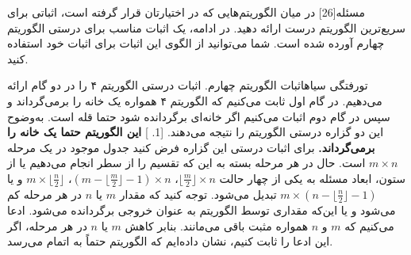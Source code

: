‌مسئله[26]
در میان الگوریتم‌هایی که در اختیارتان قرار گرفته است، اثباتی برای سریع‌ترین الگوریتم درست ارائه دهید. در ادامه، یک اثبات مناسب برای درستی الگوریتم چهارم آورده شده است. شما می‌توانید از الگوی این اثبات برای اثبات خود استفاده کنید.

‌تورفتگی
‌سیاه{اثبات الگوریتم چهارم.}
اثبات درستی الگوریتم ۴ را در دو گام ارائه می‌دهیم. در گام اول ثابت می‌کنیم که الگوریتم ۴ همواره یک خانه را برمی‌گرداند و سپس در گام دوم اثبات می‌کنیم اگر خانه‌ای برگردانده شود حتما قله است. به‌وضوح این دو گزاره درستی الگوریتم را نتیجه می‌دهند.
[1. ]
	 \textbf{این الگوریتم حتما یک خانه را برمی‌گرداند.}
	برای اثبات درستی این گزاره فرض کنید جدول موجود در یک مرحله $m\times n$ است. حال در هر مرحله بسته به این که تقسیم را از سطر انجام می‌دهیم یا از ستون، ابعاد مسئله به یکی از چهار حالت 
	$ \lfloor \frac{m}{2}\rfloor \times n$،
	$  (m - \lfloor \frac{m}{2}\rfloor - 1) \times n$،
	$ m \times \lfloor \frac{n}{2}\rfloor$ و یا 
	$ m \times (n - \lfloor \frac{n}{2}\rfloor - 1)$  
	تبدیل می‌شود. توجه کنید که مقدار $m$ یا $n$ در هر مرحله کم می‌شود و یا این‌که مقداری توسط الگوریتم به عنوان خروجی برگردانده می‌شود. ادعا می‌کنیم که $m$ و $n$ همواره مثبت باقی می‌مانند. بنابر کاهش $m$ یا $n$  در هر مرحله، اگر این ادعا را ثابت کنیم، نشان داده‌ایم که الگوریتم حتماً به اتمام می‌رسد.
	
